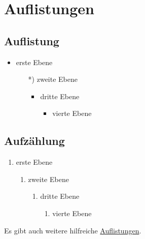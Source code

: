 \chapter{Auflistungen}

\section{Auflistung}
\begin{itemize}
  \item erste Ebene
  \begin{itemize}
    \item[*)] zweite Ebene
    \begin{itemize}
      \item dritte Ebene
        \begin{itemize}
          \item vierte Ebene
        \end{itemize}
    \end{itemize}
  \end{itemize}
\end{itemize}


\section{Aufzählung}

\begin{enumerate}
  \item erste Ebene
  \begin{enumerate}
    \item zweite Ebene
    \begin{enumerate}
      \item dritte Ebene
      \begin{enumerate}
        \item vierte Ebene
      \end{enumerate}
    \end{enumerate}
  \end{enumerate}
\end{enumerate}

\noindent Es gibt auch weitere hilfreiche \href{https://www.namsu.de/Extra/befehle/Auflistungen.html}{Auflistungen}.